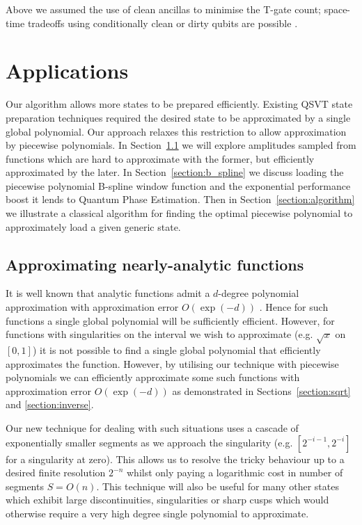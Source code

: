 \documentclass[aps,prx,twocolumn,floatfix,10pt,amssymb,amsfont,amsmath,superscriptaddress,float,nofootinbib,longbibliography,nobalancelastpage]{revtex4-2}
\theoremstyle{empty}
\begin{document}
Above we assumed the use of clean ancillas to minimise the T-gate count; space-time tradeoffs using conditionally clean or dirty qubits are possible \cite{Khattar:2024pqa, Nie:2024key}.
\section{Applications}
\label{section:applications}
Our algorithm allows more states to be prepared efficiently. Existing QSVT state preparation techniques required the desired state to be approximated by a single global polynomial. Our approach relaxes this restriction to allow approximation by piecewise polynomials. In Section~\ref{section:nearly_analytic} we will explore amplitudes sampled from functions which are hard to approximate with the former, but efficiently approximated by the later. In Section~\ref{section:b_spline} we discuss loading the piecewise polynomial B-spline window function and the exponential performance boost it lends to Quantum Phase Estimation. Then in Section~\ref{section:algorithm} we illustrate a classical algorithm for finding the optimal piecewise polynomial to approximately load a given generic state. 

\subsection{Approximating nearly-analytic functions}
\label{section:nearly_analytic}
It is well known that analytic functions admit a $d$-degree polynomial approximation with approximation error $O(\exp(-d))$ \cite{Trefethen}. Hence for such functions a single global polynomial will be sufficiently efficient. However, for functions with singularities on the interval we wish to approximate (e.g. $\sqrt{x}$ on $[0,1]$) it is not possible to find a single global polynomial that efficiently approximates the function. However, by utilising our technique with piecewise polynomials we can efficiently approximate some such functions with approximation error $O\left(\exp(-d)\right)$ as demonstrated in Sections~\ref{section:sqrt} and \ref{section:inverse}.

Our new technique for dealing with such situations uses a cascade of exponentially smaller segments as we approach the singularity (e.g. $[2^{-i-1}, 2^{-i}]$ for a singularity at zero). This allows us to resolve the tricky behaviour up to a desired finite resolution $2^{-n}$ whilst only paying a logarithmic cost in number of segments $S=O(n)$. This technique will also be useful for many other states which exhibit large discontinuities, singularities or sharp cusps which would otherwise require a very high degree single polynomial to approximate.
\end{document}

